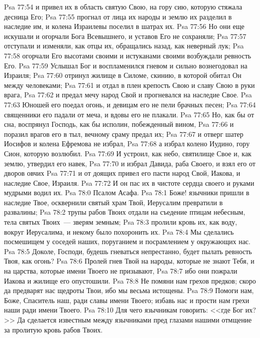 \vs Psa 77:54 и привел их в область святую Свою, на гору сию, которую стяжала десница Его;
\vs Psa 77:55 прогнал от лица их народы и землю их разделил в наследие им, и колена Израилевы поселил в шатрах их.
\vs Psa 77:56 Но они еще искушали и огорчали Бога Всевышнего, и уставов Его не сохраняли;
\vs Psa 77:57 отступали и изменяли, как отцы их, обращались назад, как неверный лук;
\vs Psa 77:58 огорчали Его высотами своими и истуканами своими возбуждали ревность Его.
\vs Psa 77:59 Услышал Бог и воспламенился гневом и сильно вознегодовал на Израиля;
\vs Psa 77:60 отринул жилище в Силоме, скинию, в которой обитал Он между человеками;
\vs Psa 77:61 и отдал в плен крепость Свою и славу Свою в руки врага,
\vs Psa 77:62 и предал мечу народ Свой и прогневался на наследие Свое.
\vs Psa 77:63 Юношей его поедал огонь, и девицам его не пели брачных песен;
\vs Psa 77:64 священники его падали от меча, и вдовы его не плакали.
\vs Psa 77:65 Но, как бы от сна, воспрянул Господь, как бы исполин, побежденный вином,
\vs Psa 77:66 и поразил врагов его в тыл, вечному сраму предал их;
\vs Psa 77:67 и отверг шатер Иосифов и колена Ефремова не избрал,
\vs Psa 77:68 а избрал колено Иудино, гору Сион, которую возлюбил.
\vs Psa 77:69 И устроил, как небо, святилище Свое и, как землю, утвердил его навек,
\vs Psa 77:70 и избрал Давида, раба Своего, и взял его от дворов овчих
\vs Psa 77:71 и от доящих привел его пасти народ Свой, Иакова, и наследие Свое, Израиля.
\vs Psa 77:72 И он пас их в чистоте сердца своего и руками мудрыми водил их.
\vs Psa 78:0 Псалом Асафа.
\rsbpar\vs Psa 78:1 Боже! язычники пришли в наследие Твое, осквернили святый храм Твой, Иерусалим превратили в развалины;
\vs Psa 78:2 трупы рабов Твоих отдали на съедение птицам небесным, тела святых Твоих~--- зверям земным;
\vs Psa 78:3 пролили кровь их, как воду, вокруг Иерусалима, и некому было похоронить их.
\vs Psa 78:4 Мы сделались посмешищем у соседей наших, поруганием и посрамлением у окружающих нас.
\vs Psa 78:5 Доколе, Господи, будешь гневаться непрестанно, будет пылать ревность Твоя, как огонь?
\vs Psa 78:6 Пролей гнев Твой на народы, которые не знают Тебя, и на царства, которые имени Твоего не призывают,
\vs Psa 78:7 ибо они пожрали Иакова и жилище его опустошили.
\vs Psa 78:8 Не помяни нам грехов  предков; скоро да предварят нас щедроты Твои, ибо мы весьма истощены.
\vs Psa 78:9 Помоги нам, Боже, Спаситель наш, ради славы имени Твоего; избавь нас и прости нам грехи наши ради имени Твоего.
\vs Psa 78:10 Для чего язычникам говорить: <<где Бог их?>> Да сделается известным между язычниками пред глазами нашими отмщение за пролитую кровь рабов Твоих.

